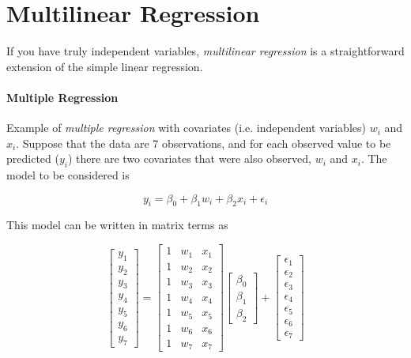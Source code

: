 \section{Multilinear Regression} 

If you have truly independent variables, \emph{multilinear regression} is a straightforward extension of the simple linear regression.

\paragraph{Multiple Regression} 
Example of \emph{multiple regression} with covariates (i.e. independent variables) $w_i$ and $x_i$.
Suppose that the data are 7 observations, and for each observed value to be predicted ($y_i$) there are two covariates that were also observed, $w_i$ and $x_i$. The model to be considered is

\begin{equation}
  y_i = \beta_0 + \beta_1 w_i + \beta_2 x_i + \epsilon_i
\end{equation}

This model can be written in matrix terms as

\begin{equation}\label{eq:multipleRegression}
  \begin{bmatrix}y_1 \\ y_2 \\ y_3 \\ y_4 \\ y_5 \\ y_6 \\ y_7 \end{bmatrix} =
    \begin{bmatrix} 1 & w_1 & x_1  \\1 & w_2 & x_2  \\1 & w_3 & x_3  \\1 & w_4 & x_4  \\1 & w_5 & x_5  \\1 & w_6 & x_6 \\ 1& w_7  & x_7  \end{bmatrix}
    \begin{bmatrix} \beta_0 \\ \beta_1 \\ \beta_2  \end{bmatrix}
    +
    \begin{bmatrix} \epsilon_1 \\ \epsilon_2 \\ \epsilon_3 \\ \epsilon_4 \\ \epsilon_5 \\ \epsilon_6 \\ \epsilon_7 \end{bmatrix}
\end{equation}


